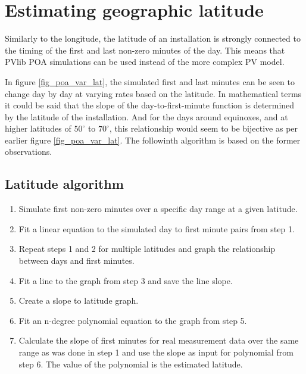 
\newpage 
\section{Estimating geographic latitude}
Similarly to the longitude, the latitude of an installation is strongly connected to the timing of the first and last non-zero minutes of the day. This means that PVlib POA simulations can be used instead of the more complex PV model.

In figure \ref{fig_poa_var_lat}, the simulated first and last minutes can be seen to change day by day at varying rates based on the latitude. In mathematical terms it could be said that the slope of the day-to-first-minute function is determined by the latitude of the installation. And for the days around equinoxes, and at higher latitudes of $50^\circ$ to $70^\circ$, this relationship would seem to be bijective as per earlier figure \ref{fig_poa_var_lat}. The followinth algorithm is based on the former observations.


\hfill


\subsection{Latitude algorithm}
\begin{enumerate}
  \item Simulate first non-zero minutes over a specific day range at a given latitude.
  
  \item Fit a linear equation to the simulated day to first minute pairs from step 1.
  
  \item Repeat steps 1 and 2 for multiple latitudes and graph the relationship between days and first minutes.
  
  \item Fit a line to the graph from step 3 and save the line slope.
  
  \item Create a slope to latitude graph.
  
  \item Fit an n-degree polynomial equation to the graph from step 5.
  
  \item Calculate the slope of first minutes for real measurement data over the same range as was done in step 1 and use the slope as input for polynomial from step 6. The value of the polynomial is the estimated latitude.
  
\end{enumerate}

